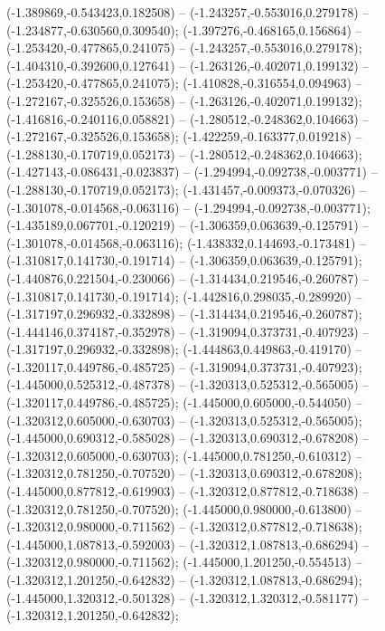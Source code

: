  (-1.389869,-0.543423,0.182508) -- (-1.243257,-0.553016,0.279178) -- (-1.234877,-0.630560,0.309540);
 (-1.397276,-0.468165,0.156864) -- (-1.253420,-0.477865,0.241075) -- (-1.243257,-0.553016,0.279178);
 (-1.404310,-0.392600,0.127641) -- (-1.263126,-0.402071,0.199132) -- (-1.253420,-0.477865,0.241075);
 (-1.410828,-0.316554,0.094963) -- (-1.272167,-0.325526,0.153658) -- (-1.263126,-0.402071,0.199132);
 (-1.416816,-0.240116,0.058821) -- (-1.280512,-0.248362,0.104663) -- (-1.272167,-0.325526,0.153658);
 (-1.422259,-0.163377,0.019218) -- (-1.288130,-0.170719,0.052173) -- (-1.280512,-0.248362,0.104663);
 (-1.427143,-0.086431,-0.023837) -- (-1.294994,-0.092738,-0.003771) -- (-1.288130,-0.170719,0.052173);
 (-1.431457,-0.009373,-0.070326) -- (-1.301078,-0.014568,-0.063116) -- (-1.294994,-0.092738,-0.003771);
 (-1.435189,0.067701,-0.120219) -- (-1.306359,0.063639,-0.125791) -- (-1.301078,-0.014568,-0.063116);
 (-1.438332,0.144693,-0.173481) -- (-1.310817,0.141730,-0.191714) -- (-1.306359,0.063639,-0.125791);
 (-1.440876,0.221504,-0.230066) -- (-1.314434,0.219546,-0.260787) -- (-1.310817,0.141730,-0.191714);
 (-1.442816,0.298035,-0.289920) -- (-1.317197,0.296932,-0.332898) -- (-1.314434,0.219546,-0.260787);
 (-1.444146,0.374187,-0.352978) -- (-1.319094,0.373731,-0.407923) -- (-1.317197,0.296932,-0.332898);
 (-1.444863,0.449863,-0.419170) -- (-1.320117,0.449786,-0.485725) -- (-1.319094,0.373731,-0.407923);
 (-1.445000,0.525312,-0.487378) -- (-1.320313,0.525312,-0.565005) -- (-1.320117,0.449786,-0.485725);
 (-1.445000,0.605000,-0.544050) -- (-1.320312,0.605000,-0.630703) -- (-1.320313,0.525312,-0.565005);
 (-1.445000,0.690312,-0.585028) -- (-1.320313,0.690312,-0.678208) -- (-1.320312,0.605000,-0.630703);
 (-1.445000,0.781250,-0.610312) -- (-1.320312,0.781250,-0.707520) -- (-1.320313,0.690312,-0.678208);
 (-1.445000,0.877812,-0.619903) -- (-1.320312,0.877812,-0.718638) -- (-1.320312,0.781250,-0.707520);
 (-1.445000,0.980000,-0.613800) -- (-1.320312,0.980000,-0.711562) -- (-1.320312,0.877812,-0.718638);
 (-1.445000,1.087813,-0.592003) -- (-1.320312,1.087813,-0.686294) -- (-1.320312,0.980000,-0.711562);
 (-1.445000,1.201250,-0.554513) -- (-1.320312,1.201250,-0.642832) -- (-1.320312,1.087813,-0.686294);
 (-1.445000,1.320312,-0.501328) -- (-1.320312,1.320312,-0.581177) -- (-1.320312,1.201250,-0.642832);
